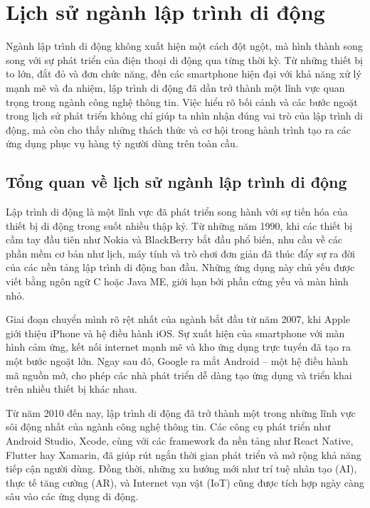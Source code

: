 \section{Lịch sử ngành lập trình di động}

  \hspace*{0.8cm}Ngành lập trình di động không xuất hiện một cách đột ngột, mà hình thành song song với sự phát triển của điện thoại di động qua từng thời kỳ. Từ những thiết bị to lớn, đắt đỏ và đơn chức năng, đến các smartphone hiện đại với khả năng xử lý mạnh mẽ và đa nhiệm, lập trình di động đã dần trở thành một lĩnh vực quan trọng trong ngành công nghệ thông tin. Việc hiểu rõ bối cảnh và các bước ngoặt trong lịch sử phát triển không chỉ giúp ta nhìn nhận đúng vai trò của lập trình di động, mà còn cho thấy những thách thức và cơ hội trong hành trình tạo ra các ứng dụng phục vụ hàng tỷ người dùng trên toàn cầu.

\subsection{Tổng quan về lịch sử ngành lập trình di động}
\renewcommand{\labelitemi}{--}  


  \hspace*{0.8cm}Lập trình di động là một lĩnh vực đã phát triển song hành với sự tiến hóa của thiết bị di động trong suốt nhiều thập kỷ. Từ những năm 1990, khi các thiết bị cầm tay đầu tiên như Nokia và BlackBerry bắt đầu phổ biến, nhu cầu về các phần mềm cơ bản như lịch, máy tính và trò chơi đơn giản đã thúc đẩy sự ra đời của các nền tảng lập trình di động ban đầu. Những ứng dụng này chủ yếu được viết bằng ngôn ngữ C hoặc Java ME, giới hạn bởi phần cứng yếu và màn hình nhỏ.

  \vspace{0.5em}

  \hspace*{0.8cm}Giai đoạn chuyển mình rõ rệt nhất của ngành bắt đầu từ năm 2007, khi Apple giới thiệu iPhone và hệ điều hành iOS. Sự xuất hiện của smartphone với màn hình cảm ứng, kết nối internet mạnh mẽ và kho ứng dụng trực tuyến đã tạo ra một bước ngoặt lớn. Ngay sau đó, Google ra mắt Android – một hệ điều hành mã nguồn mở, cho phép các nhà phát triển dễ dàng tạo ứng dụng và triển khai trên nhiều thiết bị khác nhau.

  \vspace{0.5em}

  \hspace*{0.8cm}Từ năm 2010 đến nay, lập trình di động đã trở thành một trong những lĩnh vực sôi động nhất của ngành công nghệ thông tin. Các công cụ phát triển như Android Studio, Xcode, cùng với các framework đa nền tảng như React Native, Flutter hay Xamarin, đã giúp rút ngắn thời gian phát triển và mở rộng khả năng tiếp cận người dùng. Đồng thời, những xu hướng mới như trí tuệ nhân tạo (AI), thực tế tăng cường (AR), và Internet vạn vật (IoT) cũng được tích hợp ngày càng sâu vào các ứng dụng di động.

